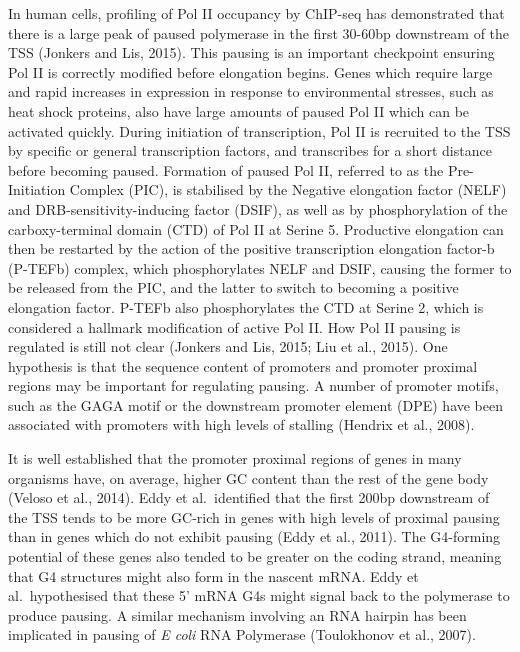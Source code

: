 \documentclass[12pt,a4paper,]{report}
\begin{document}
In human cells, profiling of Pol II occupancy by ChIP-seq has
demonstrated that there is a large peak of paused polymerase in the
first 30-60bp downstream of the TSS (Jonkers and Lis, 2015). This
pausing is an important checkpoint ensuring Pol II is correctly modified
before elongation begins. Genes which require large and rapid increases
in expression in response to environmental stresses, such as heat shock
proteins, also have large amounts of paused Pol II which can be
activated quickly. During initiation of transcription, Pol II is
recruited to the TSS by specific or general transcription factors, and
transcribes for a short distance before becoming paused. Formation of
paused Pol II, referred to as the Pre-Initiation Complex (PIC), is
stabilised by the Negative elongation factor (NELF) and
DRB-sensitivity-inducing factor (DSIF), as well as by phosphorylation of
the carboxy-terminal domain (CTD) of Pol II at Serine 5. Productive
elongation can then be restarted by the action of the positive
transcription elongation factor-b (P-TEFb) complex, which phosphorylates
NELF and DSIF, causing the former to be released from the PIC, and the
latter to switch to becoming a positive elongation factor. P-TEFb also
phosphorylates the CTD at Serine 2, which is considered a hallmark
modification of active Pol II. How Pol II pausing is regulated is still
not clear (Jonkers and Lis, 2015; Liu et al., 2015). One hypothesis is
that the sequence content of promoters and promoter proximal regions may
be important for regulating pausing. A number of promoter motifs, such
as the GAGA motif or the downstream promoter element (DPE) have been
associated with promoters with high levels of stalling (Hendrix et al.,
2008).

It is well established that the promoter proximal regions of genes in
many organisms have, on average, higher GC content than the rest of the
gene body (Veloso et al., 2014). Eddy et al.~identified that the first
200bp downstream of the TSS tends to be more GC-rich in genes with high
levels of proximal pausing than in genes which do not exhibit pausing
(Eddy et al., 2011). The G4-forming potential of these genes also tended
to be greater on the coding strand, meaning that G4 structures might
also form in the nascent mRNA. Eddy et al.~hypothesised that these 5'
mRNA G4s might signal back to the polymerase to produce pausing. A
similar mechanism involving an RNA hairpin has been implicated in
pausing of \emph{E coli} RNA Polymerase (Toulokhonov et al., 2007).
\end{document}
